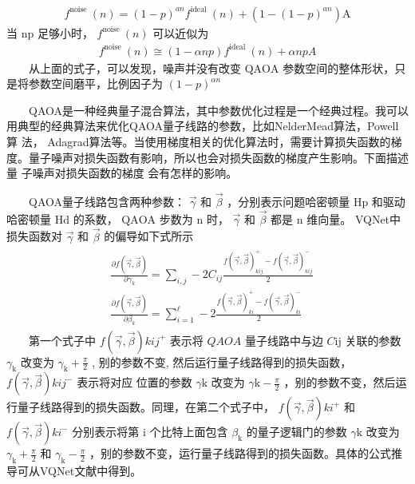 \documentclass[a4paper,11pt,english]{sphinxmanual}
\begin{document}
\begin{equation*}
\begin{split}f^{\text {noise }}(n)=(1-p)^{a n} f^{\text {ideal }}(n)+\left(1-(1-p)^{a n}\right) \mathrm{A}\end{split}
\end{equation*}
\sphinxAtStartPar
当 \(\mathrm{np}\) 足够小时， \(f^{\text {noise }}(n)\) 可以近似为
\begin{equation*}
\begin{split}f^{\text {noise }}(n) \cong(1-\alpha n p) f^{\text {ideal }}(n)+\alpha n p A\end{split}
\end{equation*}
\sphinxAtStartPar
  从上面的式子，可以发现，噪声并没有改变  \(\mathrm{QAOA}\) 参数空间的整体形状，只是将参数空间磨平，比例因子为 \((1-p)^{\alpha n}\)

\sphinxAtStartPar
{}

\sphinxAtStartPar
  QAOA是一种经典\sphinxhyphen{}量子混合算法，其中参数优化过程是一个经典过程。我可以用典型的经典算法来优化QAOA量子线路的参数，比如Nelder\sphinxhyphen{}Mead算法，Powell算 法， Adagrad算法等。当使用梯度相关的优化算法时，需要计算损失函数的梯度。量子噪声对损失函数有影响，所以也会对损失函数的梯度产生影响。下面描述量 子噪声对损失函数的梯度 会有怎样的影响。

\sphinxAtStartPar
  QAOA量子线路包含两种参数： \(\vec{\gamma}\) 和 \(\vec{\beta}\) ，分别表示问题哈密顿量 \(\mathrm{H}{\mathrm{p}}\) 和驱动哈密顿量 \(\mathrm{H}{\mathrm{d}}\) 的系数， \(\mathrm{QAOA}\) 步数为 \(\mathrm{n}\) 时， \(\vec{\gamma}\) 和  \(\vec{\beta}\) 都是 \(\mathrm{n}\) 维向量。 VQNet中损失函数对 \(\vec{\gamma}\) 和 \(\vec{\beta}\) 的偏导如下式所示
\begin{equation*}
\begin{split}\begin{aligned} &\frac{\partial f(\vec{\gamma}, \vec{\beta})}{\partial \gamma_{k}}=\sum_{i, j}-2 C_{i j} \frac{f(\vec{\gamma}, \vec{\beta})_{k i j}^{+}-f(\vec{\gamma}, \vec{\beta})_{k i j}^{-}}{2} \\ &\frac{\partial f(\vec{\gamma}, \vec{\beta})}{\partial \beta_{k}}=\sum_{i=1}^{\ell}-2 \frac{f(\vec{\gamma}, \vec{\beta})_{k i}^{+}-f(\vec{\gamma}, \vec{\beta})_{k i}^{-}}{2} \end{aligned}\end{split}
\end{equation*}
\sphinxAtStartPar
  第一个式子中 \(f(\vec{\gamma}, \vec{\beta}){k i j}^{+}\) 表示将  \(Q A O A\) 量子线路中与边  \(C{\mathrm{ij}}\) 关联的参数  \(\gamma_{\mathrm{k}}\) 改变为  \(\gamma_{\mathrm{k}}+\frac{\pi}{2}\) , 别的参数不变, 然后运行量子线路得到的损失函数， \(f(\vec{\gamma}, \vec{\beta}){k i j}^{-}\) 表示将对应 位置的参数 \(\gamma{\mathrm{k}}\) 改变为 \(\gamma{\mathrm{k}}-\frac{\pi}{2}\)  ，别的参数不变，然后运行量子线路得到的损失函数。同理，在第二个式子中， \(f(\vec{\gamma}, \vec{\beta}){k i}^{+}\) 和  \(f(\vec{\gamma}, \vec{\beta}){k i}^{-}\) 分别表示将第 \(\mathrm{i}\) 个比特上面包含  \(\beta_{\mathrm{k}}\) 的量子逻辑门的参数  \(\gamma{\mathrm{k}}\) 改变为  \(\gamma_{\mathrm{k}}+\frac{\pi}{2}\) 和  \(\gamma_{\mathrm{k}}-\frac{\pi}{2}\) ，别的参数不变，运行量子线路得到的损失函数。具体的公式推导可从VQNet文献中得到。
\end{document}
